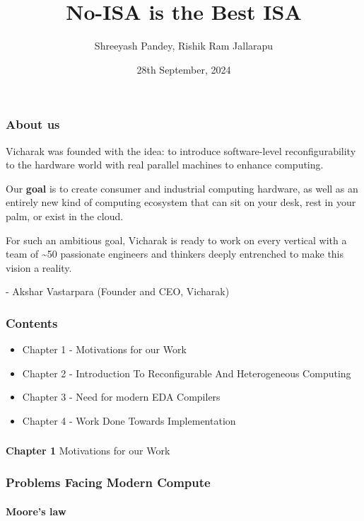 \documentclass{beamer}
\title{No-ISA is the Best ISA}
\subtitle{}
\author{Shreeyash Pandey, Rishik Ram Jallarapu}
\institute{Vicharak, India @ vicharak.in}
\date{28th September, 2024}
\begin{document}
\begin{frame}
\titlepage
\end{frame}

{

\begin{frame}[fragile]
\frametitle{About us}

  Vicharak was founded with the idea: to introduce software-level
  reconfigurability to the hardware world with real parallel machines to enhance
  computing. 

  Our \textbf{goal} is to create consumer and industrial
  computing hardware, as well as an entirely new kind of computing ecosystem
  that can sit on your desk, rest in your palm, or exist in the cloud. 

  For such an ambitious goal, Vicharak is ready to work on every vertical with
  a team of \~{}50 passionate engineers and thinkers deeply entrenched to make this
  vision a reality.

  - Akshar Vastarpara (Founder and CEO, Vicharak)

\framesubtitle{}
\end{frame}

\begin{frame}[fragile]
\frametitle{Contents}

  \begin{itemize}
    \item Chapter 1 - Motivations for our Work
    \item Chapter 2 - Introduction To Reconfigurable And Heterogeneous Computing
    \item Chapter 3 - Need for modern EDA Compilers
    \item Chapter 4 - Work Done Towards Implementation  
  \end{itemize}
\end{frame}

\begin{frame}[c,fragile]
  \frametitle{}
  \centering
  \textbf{Chapter 1}
  \centering
  Motivations for our Work
\end{frame}

\begin{frame}[fragile]
\frametitle{Problems Facing Modern Compute}
  \framesubtitle{Moore's law}


\end{frame}}
\end{document}
